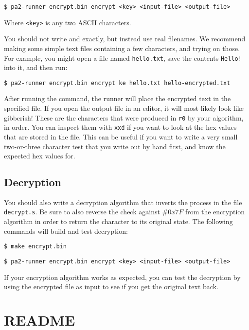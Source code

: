 \documentclass{article}
\def\r#1{\texttt{r#1}}
\begin{document}
\begin{verbatim}
$ pa2-runner encrypt.bin encrypt <key> <input-file> <output-file>
\end{verbatim}

Where {\tt <key>} is any two ASCII characters.

You should not write {\tt <input-file>} and {\tt <output-file>} exactly, but
instead use real filenames. We recommend making some simple text files
containing a few characters, and trying on those. For example, you might open a
file named {\tt hello.txt}, save the contents {\tt Hello!} into it, and then
run:

\begin{verbatim}
$ pa2-runner encrypt.bin encrypt ke hello.txt hello-encrypted.txt
\end{verbatim}

After running the command, the runner will place the encrypted text in the
specified file. If you open the output file in an editor, it will most likely
look like gibberish! These are the characters that were produced in \r{0} by
your algorithm, in order. You can inspect them with {\tt xxd} if you want to
look at the hex values that are stored in the file. This can be useful if you
want to write a very small two-or-three character test that you write out by
hand first, and know the expected hex values for.

\subsection{Decryption}

You should also write a decryption algorithm that inverts the process in the
file \texttt{decrypt.s}. Be sure to also reverse the check against $\#0x7F$ 
from the encryption algorithm in order to return the character to its original
state. The following commands will build and test decryption:

\begin{verbatim}
$ make encrypt.bin
\end{verbatim}

\begin{verbatim}
$ pa2-runner encrypt.bin encrypt <key> <input-file> <output-file>
\end{verbatim}

If your encryption algorithm works as expected, you can test the decryption by
using the encrypted file as input to see if you get the original text back.

\section{README}
\end{document}
